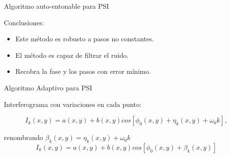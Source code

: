 \documentclass[]{beamer}
\begin{document}
\begin{frame}{Algoritmo auto-entonable para PSI}

Conclusiones:
\begin{itemize}
     \item Este m\'etodo es robusto a pasos no constantes.
     \pause \item El m\'etodo es capaz de filtrar el ruido.
     \pause \item Recobra la fase y los pasos con error m\'inimo.
\end{itemize}

\end{frame}
\begin{frame}{Algoritmo Adaptivo para PSI}

Interferograma con variaciones en cada punto:
\begin{center}
\begin{equation}
  I_k(x,y) = a(x,y)+b(x,y)cos[\phi_0(x,y) + \eta_k(x,y) + \omega_0 k],
\end{equation}

renombrando $\beta_k(x,y) = \eta_k(x,y) + \omega_0 k$
\begin{equation}
  I_k(x,y) = a(x,y)+b(x,y)cos[\phi_0(x,y) + \beta_k(x,y)]
\end{equation}

\end{center}
\end{frame}
\end{document}
